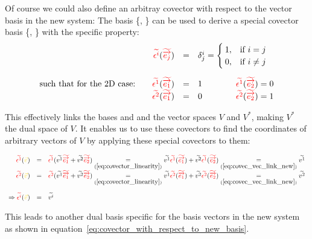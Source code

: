 Of course we could also define an arbitray covector with respect to the vector basis in
the new system: The basis \{, \} can be used to derive a special
covector basis \{, \} with the specific property:
\begin{equation}
    \label{eq:covec_vec_link_new}
    \begin{array}{rcl}
        \hdcbtvc{i}(\hdbtv{j}) & = &
        \delta^i_j = 
        \begin{cases}
            1, & \text{if}\ i = j \\
            0, & \text{if}\ i \neq j
        \end{cases} \\
        \noalign{\vskip10pt}
        \text{such that for the 2D case:}\qquad
        \hdcbtvc{1}(\hdbtv{1}) & = & 1 \qquad\qquad
        \hdcbtvc{1}(\hdbtv{2}) = 0 \\
        \hdcbtvc{2}(\hdbtv{1}) & = & 0 \qquad\qquad
        \hdcbtvc{2}(\hdbtv{2}) = 1
    \end{array}
\end{equation}

This effectively links the bases  and  and the vector spaces $V$ and
$V^*$, making $V^*$ the dual space of $V$. It enables us to use these covectors to find
the coordinates of arbitrary vectors of $V$ by applying these special covectors to them:

\begin{equation}
    \begin{array}{rcl}
        \label{eq:covec_application_new}
        \hdcbtvc{1}(\hdv) & = &
        \hdcbtvc{1}(\hdtvc{1}\hdbtv{1} + \hdtvc{2}\hdbtv{2})
        \underset{(\ref{eq:covector_linearity})}{=}
        \hdtvc{1}\hdcbtvc{1}(\hdbtv{1}) + \hdtvc{2}\hdcbtvc{1}(\hdbtv{2})
        \underset{(\ref{eq:covec_vec_link_new})}{=}
        \hdtvc{1} \\
        \hdcbtvc{2}(\hdv) & = &
        \hdcbtvc{2}(\hdtvc{1}\hdbtv{1} + \hdtvc{2}\hdbtv{2})
        \underset{(\ref{eq:covector_linearity})}{=}
        \hdtvc{1}\hdcbtvc{2}(\hdbtv{1}) + \hdtvc{2}\hdcbtvc{2}(\hdbtv{2})
        \underset{(\ref{eq:covec_vec_link_new})}{=}
        \hdtvc{2} \\
        \noalign{\vskip10pt}
        \Rightarrow \hdcbtvc{i}(\hdv) & = & \hdtvc{i}
    \end{array}
\end{equation}

This leads to another dual basis specific for the basis vectors in the new
system as shown in equation~\ref{eq:covector_with_respect_to_new_basis}.

